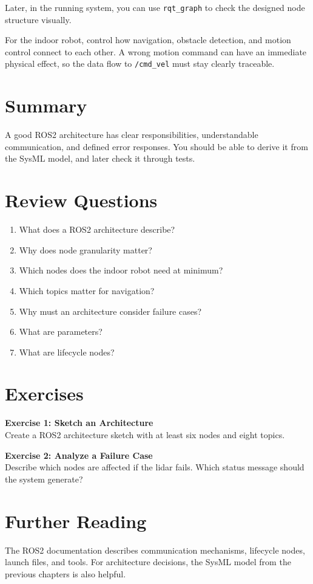 Later, in the running system, you can use \texttt{rqt\_graph} to check the designed node structure visually.

For the indoor robot, control how navigation, obstacle detection, and motion control connect to each other. A wrong motion command can have an immediate physical effect, so the data flow to \texttt{/cmd\_vel} must stay clearly traceable.

\section{Summary}
A good ROS2 architecture has clear responsibilities, understandable communication, and defined error responses. You should be able to derive it from the SysML model, and later check it through tests.

\section{Review Questions}
\begin{enumerate}
    \item What does a ROS2 architecture describe?
    \item Why does node granularity matter?
    \item Which nodes does the indoor robot need at minimum?
    \item Which topics matter for navigation?
    \item Why must an architecture consider failure cases?
    \item What are parameters?
    \item What are lifecycle nodes?
\end{enumerate}

\section{Exercises}
\begin{uebungbox}
\textbf{Exercise 1: Sketch an Architecture}\\
Create a ROS2 architecture sketch with at least six nodes and eight topics.
\end{uebungbox}

\begin{uebungbox}
\textbf{Exercise 2: Analyze a Failure Case}\\
Describe which nodes are affected if the lidar fails. Which status message should the system generate?
\end{uebungbox}

\section{Further Reading}
The ROS2 documentation \cite{ros2docs} describes communication mechanisms, lifecycle nodes, launch files, and tools. For architecture decisions, the SysML model from the previous chapters is also helpful.
